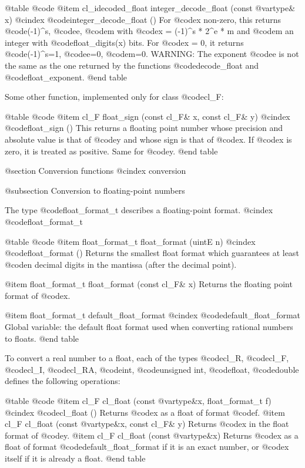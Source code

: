 @table @code
@item cl_idecoded_float integer_decode_float (const @var{type}& x)
@cindex @code{integer_decode_float ()}
For @code{x} non-zero, this returns @code{(-1)^s}, @code{e}, @code{m} with
@code{x = (-1)^s * 2^e * m} and @code{m} an integer with @code{float_digits(x)}
bits. For @code{x} = 0, it returns @code{(-1)^s}=1, @code{e}=0, @code{m}=0.
WARNING: The exponent @code{e} is not the same as the one returned by
the functions @code{decode_float} and @code{float_exponent}.
@end table

Some other function, implemented only for class @code{cl_F}:

@table @code
@item cl_F float_sign (const cl_F& x, const cl_F& y)
@cindex @code{float_sign ()}
This returns a floating point number whose precision and absolute value
is that of @code{y} and whose sign is that of @code{x}. If @code{x} is
zero, it is treated as positive. Same for @code{y}.
@end table


@section Conversion functions
@cindex conversion

@subsection Conversion to floating-point numbers

The type @code{float_format_t} describes a floating-point format.
@cindex @code{float_format_t}

@table @code
@item float_format_t float_format (uintE n)
@cindex @code{float_format ()}
Returns the smallest float format which guarantees at least @code{n}
decimal digits in the mantissa (after the decimal point).

@item float_format_t float_format (const cl_F& x)
Returns the floating point format of @code{x}.

@item float_format_t default_float_format
@cindex @code{default_float_format}
Global variable: the default float format used when converting rational numbers
to floats.
@end table

To convert a real number to a float, each of the types
@code{cl_R}, @code{cl_F}, @code{cl_I}, @code{cl_RA},
@code{int}, @code{unsigned int}, @code{float}, @code{double}
defines the following operations:

@table @code
@item cl_F cl_float (const @var{type}&x, float_format_t f)
@cindex @code{cl_float ()}
Returns @code{x} as a float of format @code{f}.
@item cl_F cl_float (const @var{type}&x, const cl_F& y)
Returns @code{x} in the float format of @code{y}.
@item cl_F cl_float (const @var{type}&x)
Returns @code{x} as a float of format @code{default_float_format} if
it is an exact number, or @code{x} itself if it is already a float.
@end table

